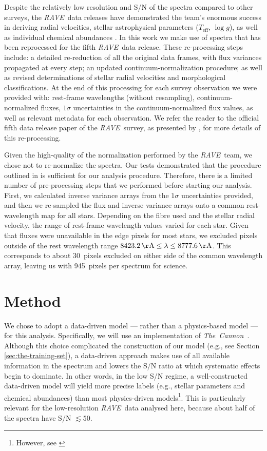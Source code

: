 \documentclass[preprint,trackchanges]{aastex}
\newcommand{\acronym}[1]{{\small{#1}}}
\newcommand{\project}[1]{\textsl{#1}}
\newcommand{\thecannon}{\project{The~Cannon}}
\newcommand{\rave}{\project{\acronym{RAVE}}}
\newcommand{\teff}{T_{\mathrm{eff}}}
\newcommand{\logg}{\log g}
\begin{document}
Despite the relatively low resolution and S/N of the spectra compared to other
surveys, the \rave\ data releases have demonstrated the team's enormous success 
in deriving radial velocities, stellar astrophysical parameters ($\teff$, $\logg$),
as well as individual chemical abundances \citep{Steinmetz_2006,Zwitter_2008,
Siebert_2011,Kordopatis_2013,Kunder_2016}.  In this work we make use of spectra
that has been reprocessed for the fifth \rave\ data release.  These re-processing
steps include: a detailed re-reduction of all the original data frames, with flux
variances propagated at every step; an updated continuum-normalization procedure;
as well as revised determinations of stellar radial velocities and morphological
classifications. At the end of this processing for each survey observation we were 
provided with: rest-frame wavelengths (without resampling), continuum-normalized 
fluxes, $1\sigma$ uncertainties in the continuum-normalized flux values, as well 
as relevant metadata for each observation.  We refer the reader to the official 
fifth data release paper of the \rave\ survey, as presented by \citet{Kunder_2016}, 
for more details of this re-processing.


Given the high-quality of the normalization performed by the \rave\ team, we chose
not to re-normalize the spectra.  Our tests demonstrated that the procedure 
outlined in \citet{Kunder_2016} is sufficient for our analysis procedure. Therefore,
there is a limited number of pre-processing steps that we performed before starting
our analysis.  First, we calculated inverse variance arrays from the $1\sigma$ 
uncertainties provided, and then we re-sampled the flux and inverse variance
arrays onto a common rest-wavelength map for all stars.  Depending on the fibre 
used and the stellar radial velocity, the range of rest-frame wavelength values
varied for each star.  Given that fluxes were unavailable in the edge pixels for 
most stars, we excluded pixels outside of the rest wavelength range 
$8423.2\,{\rm \AA} \le \lambda \le 8777.6\,{\rm \AA}$.  This corresponds to about
30~pixels excluded on either side of the common wavelength array, leaving us with
945~pixels per spectrum for science.  


\section{Method}
\label{sec:method}


We chose to adopt a data-driven model --- rather than a physics-based model ---
for this analysis.  Specifically, we will use an implementation of \thecannon\
\citep{Ness_2015,Ness_2016}.  Although this choice complicated the construction 
of our model (e.g., see Section \ref{sec:the-training-set}), a data-driven approach 
makes use of all available information in the spectrum and lowers the S/N ratio 
at which systematic effects begin to dominate.  In other words, in the low S/N
regime, a well-constructed data-driven model will yield more precise labels 
(e.g., stellar parameters and chemical abundances) than most physics-driven 
models\footnote{However, see \citet{Casey_2016a}}.  This is particularly relevant 
for the low-resolution \rave\ data analysed here, because about half of the 
spectra have S/N $\lesssim 50$.
\end{document}
